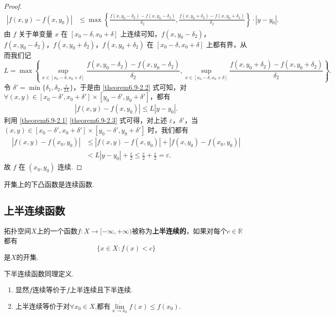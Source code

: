 \documentclass[../../main.tex]{subfiles}
\begin{document}
\begin{proof}
\begin{align}
|f(x,y) - f(x,y_0)| &\leqslant \max\left\{\frac{f(x,y_0 - \delta_2) - f(x,y_0 - \delta_2)}{\delta_2},\frac{f(x,y_0 + \delta_2) - f(x,y_0 + \delta_2)}{\delta_2}\right\}\cdot|y - y_0|. \label{theorem6.9-2.2}
\end{align}
由 \(f\) 关于单变量 \(x\) 在 \([x_0 - \delta, x_0 + \delta]\) 上连续可知，\(f(x,y_0 - \delta_2)\)，\(f(x,y_0 - \delta_2)\)，\(f(x,y_0 + \delta_2)\)，\(f(x,y_0 + \delta_2)\) 在 \([x_0 - \delta, x_0 + \delta]\) 上都有界，从而我们记 \[L = \max\left\{\sup_{x\in [x_0 - \delta, x_0 + \delta]}\frac{f(x,y_0 - \delta_2) - f(x,y_0 - \delta_2)}{\delta_2},\sup_{x\in [x_0 - \delta, x_0 + \delta]}\frac{f(x,y_0 + \delta_2) - f(x,y_0 + \delta_2)}{\delta_2}\right\}.\]令 \(\delta' = \min\{\delta_1,\delta_2,\frac{\varepsilon}{2L}\}\)，于是由 \eqref{theorem6.9-2.2} 式可知，对 \(\forall (x,y)\in [x_0 - \delta', x_0 + \delta']\times[y_0 - \delta', y_0 + \delta']\)，都有
\begin{align}
|f(x,y) - f(x,y_0)| \leqslant L|y - y_0|. \label{theorem6.9-2.3}
\end{align}
利用 \eqref{theorem6.9-2.1} \eqref{theorem6.9-2.3} 式可得，对上述 \(\varepsilon\)，\(\delta'\)，当 \((x,y)\in [x_0 - \delta', x_0 + \delta']\times[y_0 - \delta', y_0 + \delta']\) 时，我们都有
\begin{align*}
|f(x,y) - f(x_0,y_0)| &\leqslant |f(x,y) - f(x,y_0)|+|f(x,y_0) - f(x_0,y_0)| \\
&< L|y - y_0|+\frac{\varepsilon}{2} 
\leqslant \frac{\varepsilon}{2}+\frac{\varepsilon}{2}=\varepsilon.
\end{align*}
故 \(f\) 在 \((x_0,y_0)\) 连续.
\end{proof}

\begin{corollary}[开集上的下凸函数必连续]\label{corollary:开集上的下凸函数必连续}
开集上的下凸函数是连续函数.
\end{corollary}


\subsection{上半连续函数}

\begin{definition}[半连续函数定义]\label{definition:半连续函数定义}
拓扑空间\(X\)上的一个函数\(f:X\to[-\infty,+\infty)\)被称为\textbf{上半连续的}，如果对每个\(c\in\mathbb{R}\)都有
\[\{x\in X:f(x)<c\}\]
是\(X\)的开集.
\end{definition}
\begin{remark}
下半连续函数同理定义.
\end{remark}
\begin{note}
\begin{enumerate}[(1)]
\item 显然$f$连续等价于$f$上半连续且下半连续.
\item 上半连续等价于对$\forall x_0\in X$,都有$\underset{x\rightarrow x_0}{\overline{\lim }}f\left( x \right) \leqslant f\left( x_0 \right) $.
\end{enumerate}
\end{note}
\end{document}
